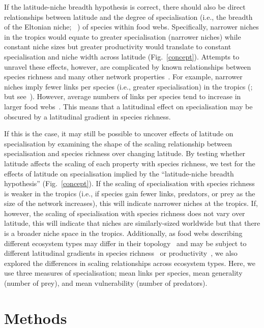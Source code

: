 \documentclass[12pt]{article}
\begin{document}
  If the latitude-niche breadth hypothesis is correct, there should also be direct relationships between latitude and the
  degree of specialisation (i.e., the breadth of the Eltonian niche; ~\cite{Elton1927,Leibold2010}) of species within food webs.
  Specifically, narrower niches in the tropics would equate to
  greater specialisation (narrower niches) while constant niche sizes but
  greater productivity would translate to constant specialisation and niche
  width across latitude (Fig.~\ref{concept}).
  Attempts to unravel these effects, however,
  are complicated by known relationships between species richness and many other network properties~\cite{Riede2010}. 
  For example,
  narrower niches imply fewer links per species (i.e., greater specialisation) in the tropics (\cite{Marra1997,Dyer2007};
  but see~\cite{Schleuning2012}). However,
  average numbers of links per species tend to increase in larger food webs~\cite{Dunne2006,Riede2010}. This means
  that a latitudinal effect on specialisation may be obscured by a latitudinal gradient in species richness. 


  If this is the case, it may still be possible to uncover effects of latitude
  on specialisation by examining the shape of the scaling  relationship
  between specialisation and species richness over changing latitude. 
  By testing whether latitude affects the scaling of each property with
  species richness, we test for the effects of latitude on specialisation
  implied by the ``latitude-niche breadth hypothesis'' (Fig.~\ref{concept}). 
  If the scaling of specialisation with species richness is weaker in the 
  tropics (i.e., if species gain fewer links, predators, or prey as the size 
  of the network increases), this will indicate narrower niches at the tropics. 
  If, however, the scaling of specialisation with species richness does not 
  vary over latitude, this will indicate that niches are similarly-sized
  worldwide but that there is a broader niche space in the tropics.
  Additionally, as food webs describing different ecosystem types may differ
  in their topology~\cite{Dunne2004,Shurin2006} and may be subject to different
  latitudinal gradients in species richness~\cite{} or productivity~\cite{},
  we also explored the differences in scaling relationships across ecosystem types.
  Here, we use three measures of specialisation; mean links per species, mean
  generality (number of prey), and mean vulnerability (number of predators).


\section*{Methods}
\end{document}
